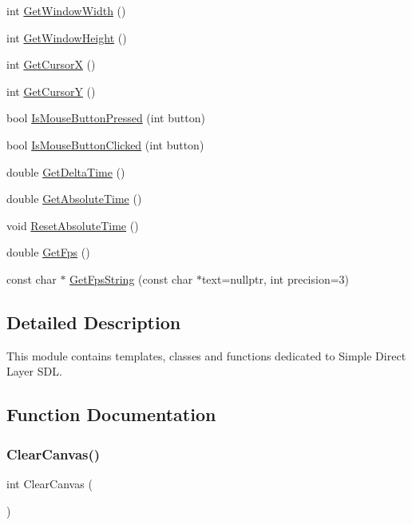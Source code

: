 \begin{DoxyCompactItemize}
int \hyperlink{group__sdl__group_gaa938d3f784d26ccd4ed8c2d83bbc6ab4}{Get\+Window\+Width} ()
\item 
int \hyperlink{group__sdl__group_gac27ddd893a70056c55278b33d7bd2c62}{Get\+Window\+Height} ()
\item 
int \hyperlink{group__sdl__group_ga7c508c83150dcd127156d9c4e2436a8e}{Get\+CursorX} ()
\item 
int \hyperlink{group__sdl__group_ga4769e37502d12fbc431ace1a32749bc8}{Get\+CursorY} ()
\item 
bool \hyperlink{group__sdl__group_ga2537bad9d6f115fee49a741e7e2623a6}{Is\+Mouse\+Button\+Pressed} (int button)
\item 
bool \hyperlink{group__sdl__group_ga8f17cac7776ed1c12041101c8abb740b}{Is\+Mouse\+Button\+Clicked} (int button)
\item 
double \hyperlink{group__sdl__group_gaf9e3349b29171ad58521f5a7a6238fca}{Get\+Delta\+Time} ()
\item 
double \hyperlink{group__sdl__group_ga9b9387d774c6bc63e5e3c6c91296dedb}{Get\+Absolute\+Time} ()
\item 
void \hyperlink{group__sdl__group_ga5b39467f3664fad21ce3c0f14c4506ff}{Reset\+Absolute\+Time} ()
\item 
double \hyperlink{group__sdl__group_gaa48ddc248a57dfa1e4afdd6be2a76531}{Get\+Fps} ()
\item 
const char $\ast$ \hyperlink{group__sdl__group_ga236d5b80ee4ca0a1abe0ae054f7fbe2f}{Get\+Fps\+String} (const char $\ast$text=nullptr, int precision=3)
\end{DoxyCompactItemize}


\subsection{Detailed Description}
This module contains templates, classes and functions dedicated to Simple Direct Layer S\+DL. 



\subsection{Function Documentation}
\mbox{\label{group__sdl__group_ga4cc0ada571b47d2b809d441fa6766b52}} 
\subsubsection{\texorpdfstring{Clear\+Canvas()}{ClearCanvas()}}
{\footnotesize\ttfamily int Clear\+Canvas (\begin{DoxyParamCaption}{ }\end{DoxyParamCaption})}

